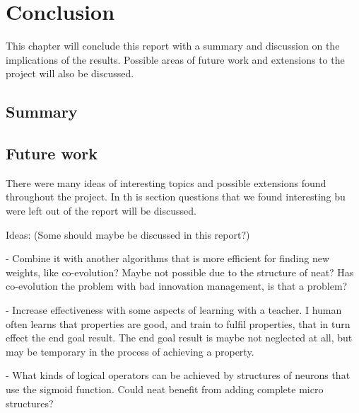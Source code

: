 \chapter{Conclusion}

This chapter will conclude this report with a summary and discussion on the implications of the results. Possible areas of future work and extensions to the project will also be discussed.

\section{Summary}

\section{Future work}


There were many ideas of interesting topics and possible extensions found throughout the project. In th
is section questions that we found interesting bu were left out of the report will be discussed. 



Ideas: (Some should maybe be discussed in this report?)

- Combine it with another algorithms that is more efficient for finding new weights, like co-evolution? Maybe not possible due to the structure of neat? Has co-evolution the problem with bad innovation management, is that a problem?

- Increase effectiveness with some aspects of learning with a teacher. I human often learns that properties are good, and train to fulfil properties, that in turn effect the end goal result. The end goal result is maybe not neglected at all, but may be temporary in the process of achieving a property.

- What kinds of logical operators can be achieved by structures of neurons that use the sigmoid function. Could neat benefit from adding complete micro structures?
